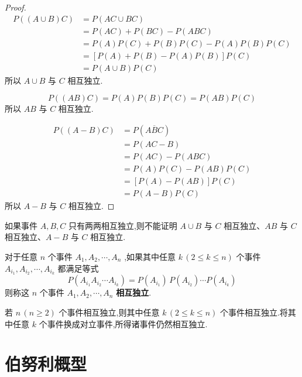 \begin{proof}
    $$
    \begin{aligned}
        P((A \cup B) C) &= P(AC \cup BC) \\
        &= P(AC) + P(BC) - P(ABC) \\
        &= P(A) P(C) + P(B) P(C) - P(A) P(B) P(C) \\
        &= [P(A) + P(B) - P(A) P(B)] P(C) \\
        &= P(A \cup B) P(C)
    \end{aligned}
    $$
    所以 $A \cup B$ 与 $C$ 相互独立.

    $$
    P((AB)C) = P(A) P(B) P(C) = P(AB) P(C)
    $$
    所以 $AB$ 与 $C$ 相互独立.

    $$
    \begin{aligned}
        P((A-B)C) &= P(A \overline{B} C) \\
        &= P(AC-B) \\
        &= P(AC) - P(ABC) \\
        &= P(A) P(C) - P(AB) P(C) \\
        &= [P(A) - P(AB)] P(C) \\
        &= P(A-B) P(C)
    \end{aligned}
    $$
    所以 $A-B$ 与 $C$ 相互独立.
\end{proof}

\begin{note}
    \indent 如果事件 $A,B,C$ 只有两两相互独立,则不能证明 $A \cup B$ 与 $C$ 相互独立、$AB$ 与 $C$ 相互独立、$A-B$ 与 $C$ 相互独立.
\end{note}

\begin{definition}
    \indent 对于任意 $n$ 个事件 $A_1,A_2,\cdots,A_n$ ,如果其中任意 $k\,(2\leqslant k\leqslant n)$ 个事件 $A_{i_1},A_{i_2},\cdots,A_{i_k}$ 都满足等式
    $$
    P(A_{i_1} A_{i_2} \cdots A_{i_k}) = P(A_{i_1}) \, P(A_{i_2}) \cdots P(A_{i_k})
    $$
    则称这 $n$ 个事件 $A_1,A_2,\cdots,A_n$ \textbf{相互独立}.
\end{definition}

\begin{conclusion}
    \indent 若 $n\, (n \geqslant 2)$ 个事件相互独立,则其中任意 $k\, (2 \leqslant k \leqslant n)$ 个事件相互独立.将其中任意 $k$ 个事件换成对立事件,所得诸事件仍然相互独立.
\end{conclusion}

\section{伯努利概型}

